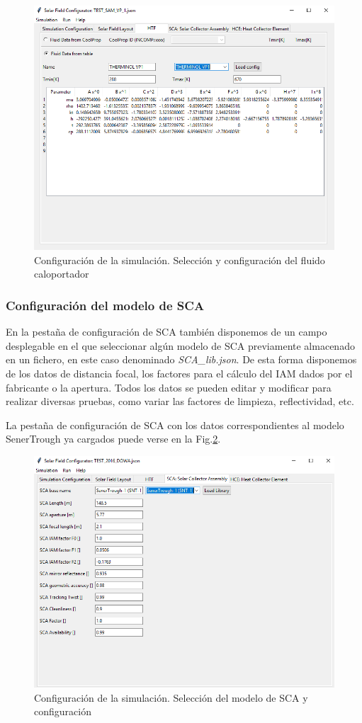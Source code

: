 \begin{figure}[H]
\includegraphics[width=0.9\linewidth]{images/interface03.png}
\caption{Configuración de la simulación. Selección y configuración del fluido caloportador} 
\label{fig:interface03}
\end{figure}

\subsubsection{Configuración del modelo de SCA} 

En la pestaña de configuración de SCA también disponemos de un campo desplegable en el que seleccionar algún modelo de SCA previamente almacenado en un fichero, en este caso denominado \emph{SCA\_lib.json}. De esta forma disponemos de los datos de distancia focal, los factores para el cálculo del IAM dados por el fabricante o la apertura. Todos los datos se pueden editar y modificar para realizar diversas pruebas, como variar las factores de limpieza, reflectividad, etc.

La pestaña de configuración de SCA con los datos correspondientes al modelo SenerTrough ya cargados puede verse en la Fig.\ref{fig:interface04}.

\begin{figure}[H]
\includegraphics[width=0.9\linewidth]{images/interface04.png}
\caption{Configuración de la simulación. Selección del modelo de SCA y configuración} 
\label{fig:interface04}
\end{figure}


